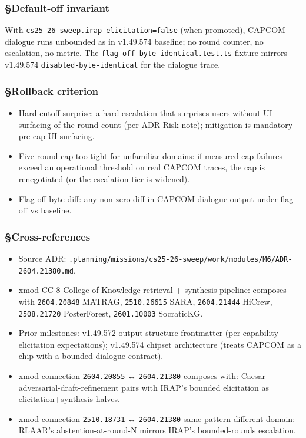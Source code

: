 \documentclass[11pt,letterpaper]{article}
\newcommand{\arxivid}[1]{\texttt{\textcolor{accent}{#1}}}
\providecommand{\tightlist}{\setlength{\itemsep}{0pt}\setlength{\parskip}{0pt}}
\begin{document}
\subsubsection{§Default-off invariant}

With \texttt{cs25-26-sweep.irap-elicitation=false} (when promoted),
CAPCOM dialogue runs unbounded as in v1.49.574 baseline; no round
counter, no escalation, no metric. The
\texttt{flag-off-byte-identical.test.ts} fixture mirrors v1.49.574
\texttt{disabled-byte-identical} for the dialogue trace.

\subsubsection{§Rollback criterion}

\begin{itemize}
\tightlist
\item
  Hard cutoff surprise: a hard escalation that surprises users without
  UI surfacing of the round count (per ADR Risk note); mitigation is
  mandatory pre-cap UI surfacing.
\item
  Five-round cap too tight for unfamiliar domains: if measured
  cap-failures exceed an operational threshold on real CAPCOM traces,
  the cap is renegotiated (or the escalation tier is widened).
\item
  Flag-off byte-diff: any non-zero diff in CAPCOM dialogue output under
  flag-off vs baseline.
\end{itemize}

\subsubsection{§Cross-references}

\begin{itemize}
\tightlist
\item
  Source ADR:
  \texttt{.planning/missions/cs25-26-sweep/work/modules/M6/ADR-\arxivid{2604.21380}.md}.
\item
  xmod CC-8 College of Knowledge retrieval + synthesis pipeline:
  composes with \arxivid{2604.20848} MATRAG, \arxivid{2510.26615} SARA,
  \arxivid{2604.21444} HiCrew, \arxivid{2508.21720} PosterForest,
  \arxivid{2601.10003} SocraticKG.
\item
  Prior milestones: v1.49.572 output-structure frontmatter
  (per-capability elicitation expectations); v1.49.574 chipset
  architecture (treats CAPCOM as a chip with a bounded-dialogue
  contract).
\item
  xmod connection \arxivid{2604.20855} ↔ \arxivid{2604.21380}
  composes-with: Caesar adversarial-draft-refinement pairs with IRAP's
  bounded elicitation as elicitation+synthesis halves.
\item
  xmod connection \arxivid{2510.18731} ↔ \arxivid{2604.21380}
  same-pattern-different-domain: RLAAR's abstention-at-round-N mirrors
  IRAP's bounded-rounds escalation.
\end{itemize}
\end{document}
